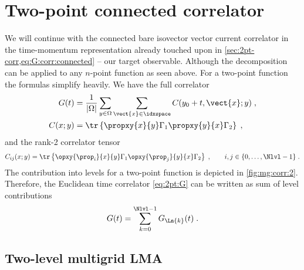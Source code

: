 \section{Two-point connected correlator}
\label{sec:mg:2pt}

We will continue with the connected bare isovector vector current correlator in the time-momentum representation already touched upon in \cref{sec:2pt-corr,eq:G:corr:connected} -- our target observable.
Although the decomposition can be applied to any $n$-point function as seen above.
For a two-point function the formulas simplify heavily.
We have the full correlator
\begin{align} \label{eq:2pt:G}
G(t) &= \frac{1}{\lvert \Omega \rvert} \sum_{y \in \Omega} \sum_{\vect{x} \in \idxspace} C(y_0+t, \vect{x} ; y) \;,
\\
C(x; y) &= \tr \left\{ \propxy{x}{y} \Gamma_1 \propxy{y}{x} \Gamma_2 \right\} \;,
\end{align}
and the rank-2 correlator tensor
\begin{equation} \label{eq:Cij}
C_{ij}(x; y) = \tr \left\{ \opxy{\prop_{i}}{x}{y} \Gamma_1 \opxy{\prop_{j}}{y}{x} \Gamma_2 \right\} \;,
\qquad i,j \in \{0, \ldots, \Nlvl-1\} \;.
\end{equation}
The contribution into levels for a two-point function is depicted in \cref{fig:mg:corr:2}.
Therefore, the Euclidean time correlator \cref{eq:2pt:G} can be written as sum of level contributions
\begin{align}
G(t) = \sum_{k=0}^{\Nlvl-1} G_{\Ln{k}}(t) \;.
\end{align}

\subsection{Two-level multigrid LMA}

